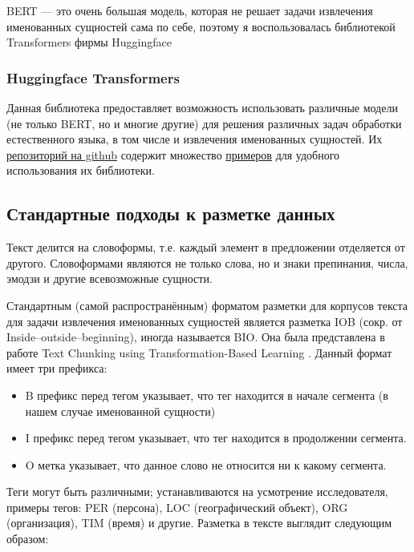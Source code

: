 BERT --- это очень большая модель, которая не решает задачи извлечения именованных сущностей сама по себе, поэтому я воспользовалась библиотекой Transformers фирмы Huggingface \cite{Wolf2019HuggingFacesTS}

\subsubsection{Huggingface Transformers}

Данная библиотека предоставляет возможность использовать различные  модели (не только BERT, но и многие другие) для решения различных задач обработки естественного языка, в том числе и извлечения именованных сущностей.
Их \href{https://github.com/huggingface/transformers}{репозиторий на github} содержит множество \href{https://github.com/huggingface/transformers/tree/master/examples/}{примеров} для удобного использования их библиотеки.


\subsection{Стандартные подходы к разметке данных}

Текст делится на словоформы, т.е. каждый элемент в предложении отделяется от другого. Словоформами являются не только слова, но и знаки препинания, числа, эмодзи и другие всевозможные сущности.

Стандартным (самой распространённым) форматом разметки для корпусов текста для задачи извлечения именованных сущностей является разметка IOB (сокр. от Inside–outside–beginning), иногда называется BIO. Она была представлена в работе Text Chunking using Transformation-Based Learning \cite{DBLP:journals/corr/cmp-lg-9505040}. Данный формат имеет три префикса:
\begin{itemize}
\item B префикс перед тегом указывает, что тег находится в начале сегмента (в нашем случае именованной сущности)
\item I префикс перед тегом указывает, что тег находится в продолжении сегмента.
\item O метка указывает, что данное слово не относится ни к какому сегмента. 
\end{itemize}
 
Теги могут быть различными; устанавливаются на усмотрение исследователя, примеры тегов: PER (персона), LOC (географический объект), ORG (организация), TIM (время) и другие. Разметка в тексте выглядит следующим образом:

